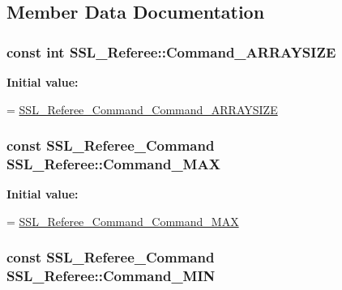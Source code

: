 \subsection{Member Data Documentation}
\hypertarget{class_s_s_l___referee_aad143983ce8c9f7e465a02c89f29f912}{
\subsubsection[{Command\-\_\-\-A\-R\-R\-A\-Y\-S\-I\-Z\-E}]{\setlength{\rightskip}{0pt plus 5cm}const int S\-S\-L\-\_\-\-Referee\-::\-Command\-\_\-\-A\-R\-R\-A\-Y\-S\-I\-Z\-E\hspace{0.3cm}{\ttfamily [static]}}}\label{class_s_s_l___referee_aad143983ce8c9f7e465a02c89f29f912}
{\bfseries Initial value\-:}
\begin{DoxyCode}
=
    \hyperlink{referee_8pb_8h_a8fe60029184465fae465cad2c1cf0ec2}{SSL\_Referee\_Command\_Command\_ARRAYSIZE}
\end{DoxyCode}
\hypertarget{class_s_s_l___referee_a29a235caf4f725e8644b45d35710f9f5}{
\subsubsection[{Command\-\_\-\-M\-A\-X}]{\setlength{\rightskip}{0pt plus 5cm}const {\bf S\-S\-L\-\_\-\-Referee\-\_\-\-Command} S\-S\-L\-\_\-\-Referee\-::\-Command\-\_\-\-M\-A\-X\hspace{0.3cm}{\ttfamily [static]}}}\label{class_s_s_l___referee_a29a235caf4f725e8644b45d35710f9f5}
{\bfseries Initial value\-:}
\begin{DoxyCode}
=
    \hyperlink{referee_8pb_8h_aa4c4b16ebeb571da1f56725886f14e34}{SSL\_Referee\_Command\_Command\_MAX}
\end{DoxyCode}
\hypertarget{class_s_s_l___referee_a7848f5c6d741aa47a3fe2b57fb1048c1}{
\subsubsection[{Command\-\_\-\-M\-I\-N}]{\setlength{\rightskip}{0pt plus 5cm}const {\bf S\-S\-L\-\_\-\-Referee\-\_\-\-Command} S\-S\-L\-\_\-\-Referee\-::\-Command\-\_\-\-M\-I\-N\hspace{0.3cm}{\ttfamily [static]}}}\label{class_s_s_l___referee_a7848f5c6d741aa47a3fe2b57fb1048c1}
